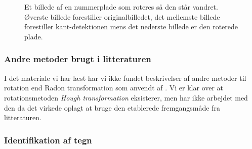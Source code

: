 \begin{figure}[htp]
  \centering
  \begin{minipage}[c]{6 cm}
  \end{minipage}\\
  \begin{minipage}[c]{6 cm}
  \end{minipage}\\
  \begin{minipage}[c]{6 cm}
  \end{minipage}
  \caption{Et billede af en nummerplade som roteres så den står vandret. Øverste billede forestiller originalbilledet, det mellemste billede forestiller kant-detektionen mens det nederste billede er den roterede plade.}
  \label{fig:Rotation}
\end{figure}


\subsubsection*{Andre metoder brugt i litteraturen}
I det materiale vi har læst har vi ikke fundet beskrivelser af andre metoder til rotation end Radon transformation som anvendt af \cite{sharpiro}. Vi er klar over at rotationsmetoden \textit{Hough transformation} eksisterer, men har ikke arbejdet med den da det virkede oplagt at bruge den etablerede fremgangsmåde fra litteraturen. 

\subsubsection{Identifikation af tegn}


